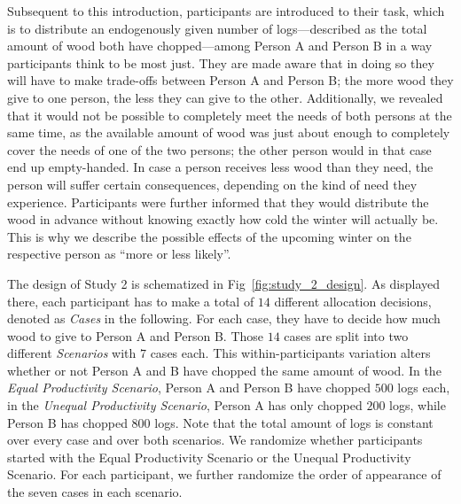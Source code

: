\documentclass[10pt,letterpaper]{article}
\begin{document}
Subsequent to this introduction, participants are introduced to their task, which is to distribute an endogenously given number of logs---described as the total amount of wood both have chopped---among Person A and Person B in a way participants think to be most just.
They are made aware that in doing so they will have to make trade-offs between Person A and Person B; the more wood they give to one person, the less they can give to the other.
Additionally, we revealed that it would not be possible to completely meet the needs of both persons at the same time, as the available amount of wood was just about enough to completely cover the needs of one of the two persons; the other person would in that case end up empty-handed.
In case a person receives less wood than they need, the person will suffer certain consequences, depending on the kind of need they experience.
Participants were further informed that they would distribute the wood in advance without knowing exactly how cold the winter will actually be.
This is why we describe the possible effects of the upcoming winter on the respective person as ``more or less likely''.

The design of Study 2 is schematized in Fig~\ref{fig:study_2_design}.
As displayed there, each participant has to make a total of $14$ different allocation decisions, denoted as \textit{Cases} in the following.
For each case, they have to decide how much wood to give to Person A and Person B.
Those $14$ cases are split into two different \textit{Scenarios} with $7$ cases each.
This within-participants variation alters whether or not Person A and B have chopped the same amount of wood.
In the \textit{Equal Productivity Scenario}, Person A and Person B have chopped $500$ logs each, in the \textit{Unequal Productivity Scenario}, Person A has only chopped $200$ logs, while Person B has chopped $800$ logs.
Note that the total amount of logs is constant over every case and over both scenarios.
We randomize whether participants started with the Equal Productivity Scenario or the Unequal Productivity Scenario.
For each participant, we further randomize the order of appearance of the seven cases in each scenario.
\end{document}
